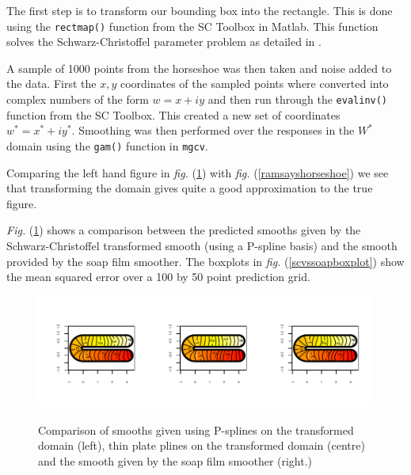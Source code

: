 \documentclass[a4paper,10pt]{amsart}
\newcommand{\sch}{Schwarz-Christoffel }
\newcommand{\fig}[1]{\emph{fig.} (\ref{#1})}
\newcommand{\Fig}[1]{\emph{Fig.} (\ref{#1})}
\begin{document}
The first step is to transform our bounding box into the rectangle. This is done using the \texttt{rectmap()} function from the SC Toolbox in Matlab. This function solves the \sch parameter problem as detailed in \cite{miller08}.

A sample of 1000 points from the horseshoe was then taken and noise added to the data. First the $x,y$ coordinates of the sampled points where converted into complex numbers of the form $w=x+iy$ and then run through the \texttt{evalinv()} function from the SC Toolbox. This created a new set of coordinates $w^*=x^*+iy^*$. Smoothing was then performed over the responses in the $W^*$ domain using the \texttt{gam()} function in \texttt{mgcv}. 

Comparing the left hand figure in \fig{compsmooth} with \fig{ramsayshorseshoe} we see that transforming the domain gives quite a good approximation to the true figure.

\Fig{compsmooth} shows a comparison between the predicted smooths given by the \sch transformed smooth (using a P-spline basis) and the smooth provided by the soap film smoother. The boxplots in \fig{scvssoapboxplot} show the mean squared error over a 100 by 50 point prediction grid.

\begin{figure}
\centering
\includegraphics[trim=0.5in 0.5in 0in 0in]{figs/compsmooth.pdf} \\
\caption{Comparison of smooths given using P-splines on the transformed domain (left), thin plate plines on the transformed domain (centre) and the smooth given by the soap film smoother (right.)}
\label{compsmooth}
\end{figure}
\end{document}
